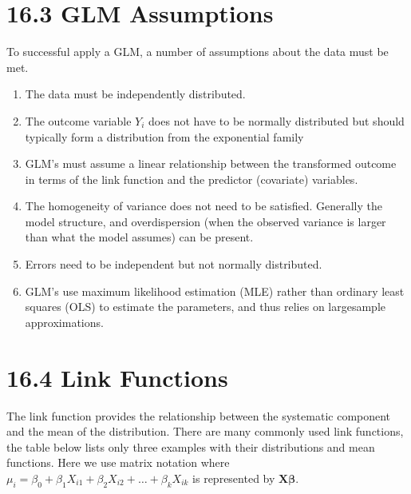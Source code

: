 \documentclass[letterpaper,10pt,english]{jupyterBook}
\begin{document}
\section{16.3 GLM Assumptions}
\label{\detokenize{16.d. Generalised Linear Model (GLM):glm-assumptions}}\label{\detokenize{16.d. Generalised Linear Model (GLM)::doc}}
\sphinxAtStartPar
To successful apply a GLM, a number of assumptions about the data must be met.
\begin{enumerate}
%
\item {} 
\sphinxAtStartPar
The data must be independently distributed.

\item {} 
\sphinxAtStartPar
The outcome variable \(Y_{i}\) does not have to be normally distributed but should typically form a distribution from the exponential family

\item {} 
\sphinxAtStartPar
GLM’s must assume a linear relationship between the transformed outcome in terms of the link function and the predictor (covariate) variables.

\item {} 
\sphinxAtStartPar
The homogeneity of variance does not need to be satisfied. Generally the model structure, and overdispersion (when the observed variance is larger than what the model assumes) can be present.

\item {} 
\sphinxAtStartPar
Errors need to be independent but not normally distributed.

\item {} 
\sphinxAtStartPar
GLM’s use maximum likelihood estimation (MLE) rather than ordinary least squares (OLS) to estimate the parameters, and thus relies on large\sphinxhyphen{}sample approximations.

\end{enumerate}


\section{16.4 Link Functions}
\label{\detokenize{16.e. Generalised Linear Model (GLM):link-functions}}\label{\detokenize{16.e. Generalised Linear Model (GLM)::doc}}
\sphinxAtStartPar
The link function provides the relationship between the systematic component and the mean of the distribution. There are many commonly used link functions, the table below lists only three examples with their distributions and mean functions. Here we use matrix notation where \(\mu_{i}  = \beta_{0} + \beta_{1}X_{i1} + \beta_{2}X_{i2} + … + \beta_{k}X_{ik}\)  is represented by \(\mathbf{X}\mathbf{\beta}\).
\end{document}
